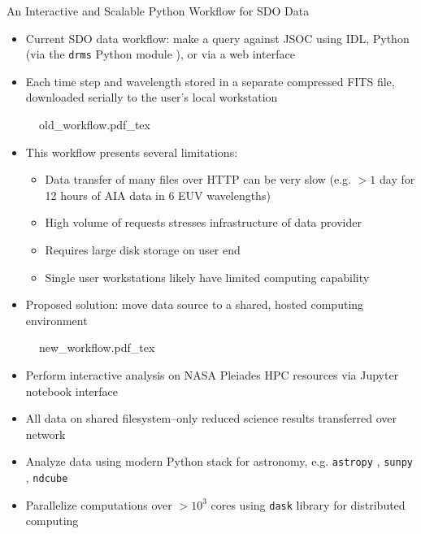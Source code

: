 \documentclass[final,12pt]{beamer}
\newlength{\colwidth}
\begin{document}
\begin{frame}[fragile,t]
\begin{columns}[T]
\begin{column}{\colwidth}
  \begin{block}{An Interactive and Scalable Python Workflow for SDO Data}

    \begin{itemize}
      \item Current SDO data workflow: make a query against JSOC using IDL, Python (via the \texttt{drms} Python module \citep{glogowski_drms_2019}), or via a web interface
      \item Each time step and wavelength stored in a separate compressed FITS file, downloaded serially to the user's local workstation
    \end{itemize}

    \begin{figure}
      \centering
      \def\svgwidth{0.7\columnwidth}
      {old_workflow.pdf_tex}
    \end{figure}

    \begin{itemize}
      \item This workflow presents several limitations:
      \begin{itemize}
        \item Data transfer of many files over HTTP can be very slow (e.g. $>1$ day for 12 hours of AIA data in 6 EUV wavelengths)
        \item High volume of requests stresses infrastructure of data provider
        \item Requires large disk storage on user end
        \item Single user workstations likely have limited computing capability
      \end{itemize}
      \item Proposed solution: \alert{move data source to a shared, hosted computing environment} 
    \end{itemize}

    \begin{figure}
      \centering
      \def\svgwidth{0.8\columnwidth}
      {new_workflow.pdf_tex}
    \end{figure}

    \begin{itemize}
      \item Perform interactive analysis on \alert{NASA Pleiades HPC} resources via Jupyter notebook interface
      \item All data on shared filesystem--only reduced science results transferred over network
      \item Analyze data using modern Python stack for astronomy, e.g. \texttt{astropy} \citep{the_astropy_collaboration_astropy_2018}, \texttt{sunpy} \citep{sunpy_community_sunpypython_2015}, \texttt{ndcube}
      \item \alert{Parallelize computations over $>10^3$ cores} using \texttt{dask} library for distributed computing \citep{rocklin_dask_2015}
    \end{itemize}


\end{block}
\end{column}
\end{columns}
\end{frame}
\end{document}
